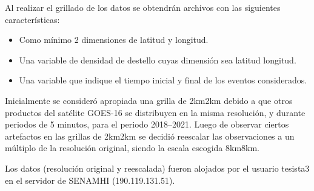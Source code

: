 Al realizar el grillado de los datos se obtendrán archivos con las siguientes 
características:

\begin{itemize}
  \item Como mínimo 2 dimensiones de latitud y longitud.
  \item Una variable de densidad de destello cuyas dimensión sea latitud\times
  longitud.
  \item Una variable que indique el tiempo inicial y final de los eventos 
  considerados.
\end{itemize}

Inicialmente se consideró apropiada una grilla de 2km\times 2km debido a que
otros productos del satélite GOES-16 se distribuyen en la misma resolución, y
durante periodos de 5 minutos, para el periodo 2018--2021.
Luego de observar ciertos artefactos en las grillas de 2km\times 2km se decidió
reescalar las observaciones a un múltiplo de la resolución original, siendo la
escala escogida 8km\times 8km.

Los datos (resolución original y reescalada) fueron alojados por el usuario
tesista3 en el servidor de SENAMHI (190.119.131.51).

